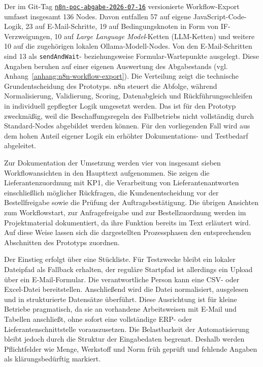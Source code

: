 \documentclass[a4paper,12pt]{article}
\begin{document}
Der im Git-Tag \hyperref[anhang:n8n-workflow-export]{\texttt{n8n-poc-abgabe-2026-07-16}} versionierte Workflow-Export umfasst insgesamt 136 Nodes. Davon entfallen 57 auf eigene JavaScript-Code-Logik, 23 auf E-Mail-Schritte, 19 auf Bedingungsknoten in Form von IF-Verzweigungen, 10 auf \textit{Large Language Model}-Ketten (LLM-Ketten) und weitere 10 auf die zugehörigen lokalen Ollama-Modell-Nodes. Von den E-Mail-Schritten sind 13 als \texttt{sendAndWait}- beziehungsweise Formular-Wartepunkte ausgelegt. Diese Angaben beruhen auf einer eigenen Auswertung des Abgabestands (vgl. Anhang~\ref{anhang:n8n-workflow-export}). Die Verteilung zeigt die technische Grundentscheidung des Prototyps. n8n steuert die Abfolge, während Normalisierung, Validierung, Scoring, Datenabgleich und Rückführungsschleifen in individuell gepflegter Logik umgesetzt werden. Das ist für den Prototyp zweckmäßig, weil die Beschaffungsregeln des Fallbetriebs nicht vollständig durch Standard-Nodes abgebildet werden können. Für den vorliegenden Fall wird aus dem hohen Anteil eigener Logik ein erhöhter Dokumentations- und Testbedarf abgeleitet.

Zur Dokumentation der Umsetzung werden vier von insgesamt sieben Workflowansichten in den Haupttext aufgenommen. Sie zeigen die Lieferantenzuordnung mit KP1, die Verarbeitung von Lieferantenantworten einschließlich möglicher Rückfragen, die Kundenentscheidung vor der Bestellfreigabe sowie die Prüfung der Auftragsbestätigung. Die übrigen Ansichten zum Workflowstart, zur Anfragefreigabe und zur Bestellzuordnung werden im Projektmaterial dokumentiert, da ihre Funktion bereits im Text erläutert wird. Auf diese Weise lassen sich die dargestellten Prozessphasen den entsprechenden Abschnitten des Prototyps zuordnen.

Der Einstieg erfolgt über eine Stückliste. Für Testzwecke bleibt ein lokaler Dateipfad als Fallback erhalten, der reguläre Startpfad ist allerdings ein Upload über ein E-Mail-Formular. Die verantwortliche Person kann eine CSV- oder Excel-Datei bereitstellen. Anschließend wird die Datei normalisiert, ausgelesen und in strukturierte Datensätze überführt. Diese Ausrichtung ist für kleine Betriebe pragmatisch, da sie an vorhandene Arbeitsweisen mit E-Mail und Tabellen anschließt, ohne sofort eine vollständige ERP- oder Lieferantenschnittstelle vorauszusetzen. Die Belastbarkeit der Automatisierung bleibt jedoch durch die Struktur der Eingabedaten begrenzt. Deshalb werden Pflichtfelder wie Menge, Werkstoff und Norm früh geprüft und fehlende Angaben als klärungsbedürftig markiert.
\end{document}
